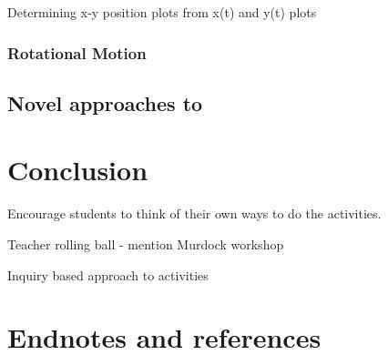 \documentclass[prb,preprint]{revtex4-1}
\begin{document}
Determining x-y position plots from x(t) and y(t) plots

\subsubsection{Rotational Motion}


\subsection{Novel approaches to}

\section{Conclusion}

Encourage students to think of their own ways to do the activities.

Teacher rolling ball - mention Murdock workshop

Inquiry based approach to activities







\section{Endnotes and references}



\begin{acknowledgments}


\end{acknowledgments}


\begin{thebibliography}{99}

\end{thebibliography}
\end{document}
